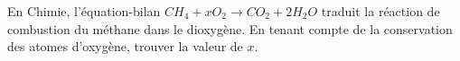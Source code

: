 En Chimie, l'équation-bilan $CH_4 + x O_2 \longrightarrow CO_2 + 2 H_2O$ traduit la réaction de combustion du méthane dans le dioxygène. 
En tenant compte de la conservation des atomes d'oxygène, trouver la valeur de $x$.